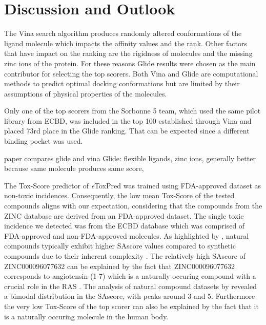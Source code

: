 \documentclass[11pt, letterpaper, titlepage]{article}
\renewcommand{\cite}{\parencite}
\begin{document}
\FloatBarrier

\section{Discussion and Outlook}
The Vina search algorithm produces randomly altered conformations of the ligand molecule which impacts the affinity values and the rank. Other factors that have impact on the ranking are the rigidness of molecules and the missing zinc ions of the protein. For these reasons Glide results were chosen as the main contributor for selecting the top scorers. Both Vina and Glide are computational methods to predict optimal docking conformations but are limited by their assumptions of physical properties of the molecules. 

Only one of the top scorers from the Sorbonne 5 team, which used the same pilot library from ECBD, was included in the top 100 established through Vina and placed 73rd place in the Glide ranking. That can be expected since a different binding pocket was used.

paper compares glide and vina
Glide: flexible ligands, zinc ions, generally better because same molecule produces same score, 


The Tox-Score predictor of \textit{e}ToxPred was trained using \ac{FDA}-approved dataset as non-toxic incidences. Consequently, the low mean Tox-Score of the tested compounds aligns with our expectation, considering that the compounds from the ZINC database are derived from an \ac{FDA}-approved dataset. The single toxic incidence we detected was from the ECBD database which was comprised of \ac{FDA}-approved and non-\ac{FDA}-approved molecules.
As highlighted by \citeauthor{pu2019toxpred}, natural compounds typically exhibit higher \ac{SAscore} values compared to synthetic compounds due to their inherent complexity \cite{pu2019toxpred}. The relatively high \ac{SAscore} of ZINC000096077632 can be explained by the fact that ZINC000096077632 corresponds to angiotensin-(1-7) which is a naturally occuring compound with a crucial role in the \ac{RAS} \cite{santosangiotensin}. The analysis of natural compound datasets by \citeauthor{pu2019toxpred} revealed a bimodal distribution in the \ac{SAscore}, with peaks around 3 and 5. Furthermore the very low Tox-Score of the top scorer can also be explained by the fact that it is a naturally occuring molecule in the human body. \\
\end{document}
